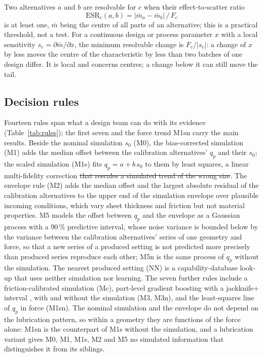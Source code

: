 \documentclass[pdflatex,sn-basic,lineno]{sn-jnl}
\providecommand{\DIFdel}[1]{{\protect\color{red}\sout{#1}}}                      %
\providecommand{\DIFdelbegin}{} %
\providecommand{\DIFdelend}{} %
\newcommand{\DIFscaledelfig}{0.5}
\newlength{\DIFdelgraphicswidth} %
\newlength{\DIFdelgraphicsheight} %
\newcommand{\DIFdelincludegraphics}[2][]{%
\sbox{\DIFdelgraphicsbox}{\DIFOincludegraphics[#1]{#2}}%
\settoboxwidth{\DIFdelgraphicswidth}{\DIFdelgraphicsbox} %
\settoboxtotalheight{\DIFdelgraphicsheight}{\DIFdelgraphicsbox} %
\scalebox{\DIFscaledelfig}{%
\parbox[b]{\DIFdelgraphicswidth}{\usebox{\DIFdelgraphicsbox}\\[-\baselineskip] \rule{\DIFdelgraphicswidth}{0em}}\llap{\resizebox{\DIFdelgraphicswidth}{\DIFdelgraphicsheight}{%
\setlength{\unitlength}{\DIFdelgraphicswidth}%
\begin{picture}(1,1)%
\thicklines\linethickness{2pt} %
{\color[rgb]{1,0,0}\put(0,0){\framebox(1,1){}}}%
{\color[rgb]{1,0,0}\put(0,0){\line( 1,1){1}}}%
{\color[rgb]{1,0,0}\put(0,1){\line(1,-1){1}}}%
\end{picture}%
}\hspace*{3pt}}} %
} %
\DeclareRobustCommand{\DIFdelbegin}{\DIFOdelbegin \let\includegraphics\DIFdelincludegraphics} %
\DeclareRobustCommand{\DIFdelend}{\DIFOaddend \let\includegraphics\DIFOincludegraphics} %
\begin{document}
Two alternatives $a$ and $b$ are resolvable for $c$ when their effect-to-scatter ratio
\begin{equation}
\mathrm{ESR}_c(a,b) = |\bar m_a - \bar m_b| \,/\, F_c
\label{eq:esr}
\end{equation}
is at least one, $\bar m$ being the centre of all parts of an alternative; this is a practical threshold, not a test. For a continuous design or process parameter $x$ with a local sensitivity $s_c = \partial \bar m/\partial x$, the minimum resolvable change is $F_c/|s_c|$: a change of $x$ by less moves the centre of the characteristic by less than two batches of one design differ. It is local and concerns centres; a change below it can still move the tail.

\subsection{Decision rules}\label{sec:rules}

Fourteen rules span what a design team can do with its evidence (Table~\ref{tab:rules}); the first seven and the force trend M1sn carry the main results. Beside the nominal simulation $s_0$ (M0), the bias-corrected simulation (M1) adds the median offset between the calibration alternatives' $q_p$ and their $s_0$; the scaled simulation (M1s) fits $q_p = a + b\,s_0$ to them by least squares, a linear multi-fidelity correction \citep{kennedy2000predicting}\DIFdelbegin \DIFdel{that rescales a simulated trend of the wrong size}\DIFdelend . The envelope rule (M2) adds the median offset and the largest absolute residual of the calibration alternatives to the upper end of the simulation envelope over plausible incoming conditions, which vary sheet thickness and friction but not material properties. M5 models the offset between $q_p$ and the envelope as a Gaussian process \citep{rasmussen2006gaussian} with a 90\,\% predictive interval, whose noise variance is bounded below by the variance between the calibration alternatives' series of one geometry and force, so that a new series of a produced setting is not predicted more precisely than produced series reproduce each other; M5n is the same process of $q_p$ without the simulation. The nearest produced setting (NN) is a capability-database look-up that uses neither simulation nor learning. The seven further rules include a friction-calibrated simulation \citep{kennedy2001bayesian} (Mc), part-level gradient boosting \citep{friedman2001greedy} with a jackknife+ interval \citep{barber2021predictive}, with and without the simulation (M3, M3n), and the least-squares line of $q_p$ in force (M1sn). The nominal simulation and the envelope do not depend on the lubrication pattern, so within a geometry they are functions of the force alone: M1sn is the counterpart of M1s without the simulation, and a lubrication variant gives M0, M1, M1s, M2 and M5 no simulated information that distinguishes it from its siblings.
\end{document}
